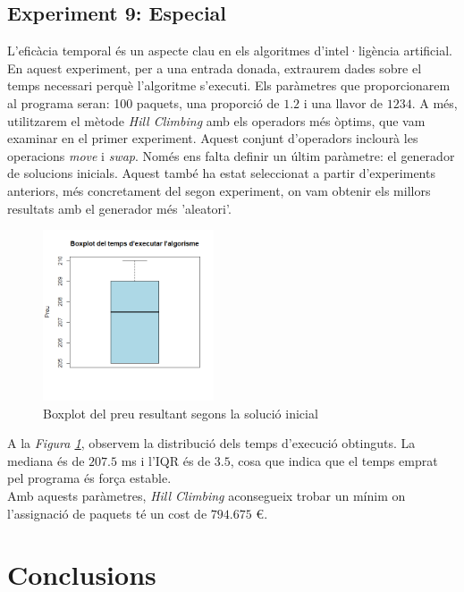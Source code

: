 \documentclass[a4paper]{article}
\begin{document}
\begin{table}[ht]
	\subsection{Experiment 9: Especial}
	
	L'eficàcia temporal és un aspecte clau en els algoritmes d'intel·ligència artificial. En aquest experiment, per a una entrada donada, extraurem dades sobre el temps necessari perquè l'algoritme s'executi. Els paràmetres que proporcionarem al programa seran: 100 paquets, una proporció de $1.2$ i una llavor de $1234$. A més, utilitzarem el mètode \textit{Hill Climbing} amb els operadors més òptims, que vam examinar en el primer experiment. Aquest conjunt d'operadors inclourà les operacions \textit{move} i \textit{swap}. Només ens falta definir un últim paràmetre: el generador de solucions inicials. Aquest també ha estat seleccionat a partir d'experiments anteriors, més concretament del segon experiment, on vam obtenir els millors resultats amb el generador més 'aleatori'. \\
	
	\begin{figure}[H]
		\centering
		\includegraphics[width=0.45\textwidth]{images/exp9_boxplot.png}
		\caption{Boxplot del preu resultant segons la solució inicial}
		\label{fig:exp9_boxplot}
	\end{figure}
	
	A la \textit{Figura \ref{fig:exp9_boxplot}}, observem la distribució dels temps d'execució obtinguts. La mediana és de $207.5$ ms i l'IQR és de $3.5$, cosa que indica que el temps emprat pel programa és força estable. \\
	
	Amb aquests paràmetres, \textit{Hill Climbing} aconsegueix trobar un mínim on l'assignació de paquets té un cost de $794.675$ €.
	
	\newpage
	\section{Conclusions}


\end{table}
\end{document}
